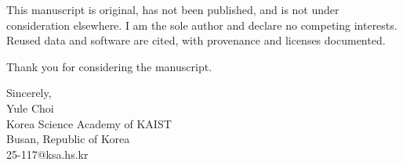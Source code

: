 \documentclass[11pt,a4paper]{article}
\begin{document}
This manuscript is original, has not been published, and is not under consideration elsewhere. I am the sole author and declare no competing interests. Reused data and software are cited, with provenance and licenses documented.

Thank you for considering the manuscript.

Sincerely,\\Yule Choi\\Korea Science Academy of KAIST\\Busan, Republic of Korea\\25-117@ksa.hs.kr
\end{document}
